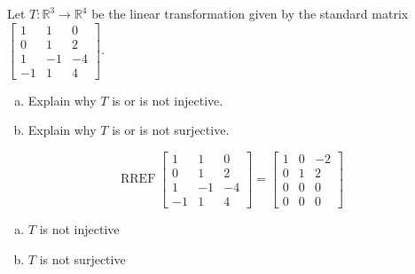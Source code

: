 
\begin{exerciseStatement}
 Let \(T:\mathbb{R}^ 3  \to \mathbb{R}^ 4 \) be the linear transformation given by the standard matrix \( \left[\begin{array}{ccc}
1 & 1 & 0 \\
0 & 1 & 2 \\
1 & -1 & -4 \\
-1 & 1 & 4
\end{array}\right] .\)
\begin{enumerate}[(a)]
\item Explain why \(T\) is or is not injective.
\item Explain why \(T\) is or is not surjective.
\end{enumerate}
    
\end{exerciseStatement}
    
\begin{exerciseAnswer} 


\[\operatorname{RREF} \left[\begin{array}{ccc}
1 & 1 & 0 \\
0 & 1 & 2 \\
1 & -1 & -4 \\
-1 & 1 & 4
\end{array}\right] = \left[\begin{array}{ccc}
1 & 0 & -2 \\
0 & 1 & 2 \\
0 & 0 & 0 \\
0 & 0 & 0
\end{array}\right] \]


\begin{enumerate}[(a)]
\item \(T\) is not injective
\item \(T\) is not surjective
\end{enumerate}
    
\end{exerciseAnswer}
    
